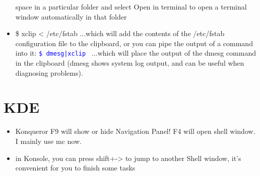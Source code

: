 \documentclass[a4paper,12pt,twoside]{book}
\newcommand{\linuxcommand}[1]{\texttt{\textcolor{blue}{\$ #1 \Pisymbol{psy}{191}}}}
\begin{document}
\begin{CJK*}{UTF8}{song}
\begin{itemize}
		space in a particular folder and select Open in terminal to open a terminal window automatically in that folder
		\item \$ xclip < /etc/fstab
		...which will add the contents of the /etc/fstab configuration file to the clipboard, or you can pipe the output of a command into it:
		\linuxcommand{dmesg|xclip}
		...which will place the output of the dmesg command in the clipboard (dmesg shows system log output, and can be useful when diagnosing problems).
	\end{itemize}

\section{KDE}
		\begin{itemize}
		\item Konqueror F9 will show or hide Navigation Panel! F4 will open shell window. I mainly use mc now.
		\item in Konsole, you can press shift+-> to jump to another Shell window, it's convenient for you to finish some tasks
		\end{itemize}

\ifx \allfiles \undefined
\end{CJK*}
\end{document}
